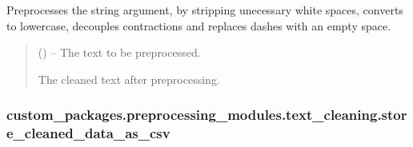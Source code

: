\documentclass[letterpaper,10pt,english]{sphinxhowto}
\begin{document}
\begin{fulllineitems}
\label{\detokenize{_autosummary/custom_packages.preprocessing_modules.text_cleaning.clean_text:custom_packages.preprocessing_modules.text_cleaning.clean_text}}
\pysigstartsignatures
\pysiglinewithargsret
{}
{}
{}
\pysigstopsignatures
\sphinxAtStartPar
Preprocesses the string argument, by stripping unecessary white spaces,
converts to lowercase, decouples contractions and replaces dashes with an empty space.
\begin{quote}\begin{description}
\sphinxAtStartPar
{} () – The text to be preprocessed.

\sphinxAtStartPar
The cleaned text after preprocessing.

\sphinxAtStartPar
{}

\end{description}\end{quote}

\end{fulllineitems}


\sphinxstepscope


\subsubsection{custom\_packages.preprocessing\_modules.text\_cleaning.store\_cleaned\_data\_as\_csv}
\label{\detokenize{_autosummary/custom_packages.preprocessing_modules.text_cleaning.store_cleaned_data_as_csv:custom-packages-preprocessing-modules-text-cleaning-store-cleaned-data-as-csv}}\label{\detokenize{_autosummary/custom_packages.preprocessing_modules.text_cleaning.store_cleaned_data_as_csv::doc}}
\end{document}
